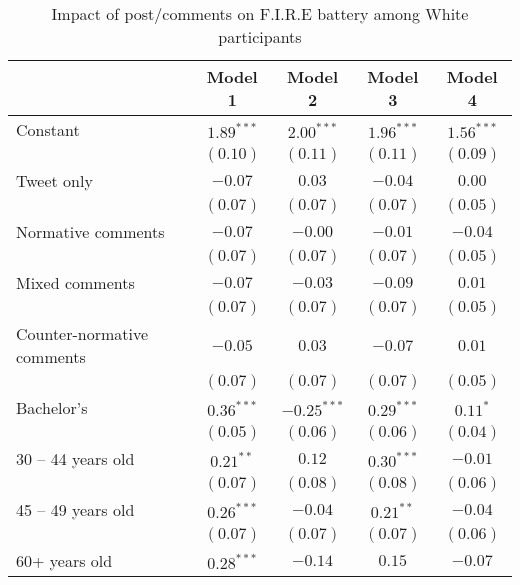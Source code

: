 
\begin{table}[h!]
\caption{Impact of post/comments on F.I.R.E battery among White participants}
\begin{center}
\begin{scriptsize}
\begin{tabular}{l c c c c}
\toprule
 & Model 1 & Model 2 & Model 3 & Model 4 \\
\midrule
Constant                   & $1.89^{***}$  & $2.00^{***}$  & $1.96^{***}$  & $1.56^{***}$ \\
                           & $(0.10)$      & $(0.11)$      & $(0.11)$      & $(0.09)$     \\
Tweet only                 & $-0.07$       & $0.03$        & $-0.04$       & $0.00$       \\
                           & $(0.07)$      & $(0.07)$      & $(0.07)$      & $(0.05)$     \\
Normative comments         & $-0.07$       & $-0.00$       & $-0.01$       & $-0.04$      \\
                           & $(0.07)$      & $(0.07)$      & $(0.07)$      & $(0.05)$     \\
Mixed comments             & $-0.07$       & $-0.03$       & $-0.09$       & $0.01$       \\
                           & $(0.07)$      & $(0.07)$      & $(0.07)$      & $(0.05)$     \\
Counter-normative comments & $-0.05$       & $0.03$        & $-0.07$       & $0.01$       \\
                           & $(0.07)$      & $(0.07)$      & $(0.07)$      & $(0.05)$     \\
Bachelor's                 & $0.36^{***}$  & $-0.25^{***}$ & $0.29^{***}$  & $0.11^{*}$   \\
                           & $(0.05)$      & $(0.06)$      & $(0.06)$      & $(0.04)$     \\
30 -- 44 years old         & $0.21^{**}$   & $0.12$        & $0.30^{***}$  & $-0.01$      \\
                           & $(0.07)$      & $(0.08)$      & $(0.08)$      & $(0.06)$     \\
45 -- 49 years old         & $0.26^{***}$  & $-0.04$       & $0.21^{**}$   & $-0.04$      \\
                           & $(0.07)$      & $(0.07)$      & $(0.07)$      & $(0.06)$     \\
60+ years old              & $0.28^{***}$  & $-0.14$       & $0.15$        & $-0.07$      \\

\end{tabular}
\end{scriptsize}
\end{center}
\end{table}
